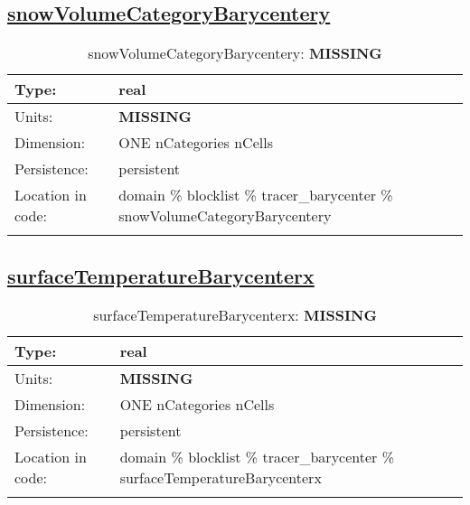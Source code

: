 \subsection[snowVolumeCategoryBarycentery]{\hyperref[sec:var_tab_tracer_barycenter]{snowVolumeCategoryBarycentery}}
\label{subsec:var_sec_tracer_barycenter_snowVolumeCategoryBarycentery}
\begin{center}
\begin{longtable}{| p{2.0in} | p{4.0in} |}
        \hline 
        Type: & real \\
        \hline 
        Units: & {\bf \color{red} MISSING} \\
        \hline 
        Dimension: & ONE nCategories nCells \\
        \hline 
        Persistence: & persistent \\
        \hline 
         Location in code: & domain \% blocklist \% tracer\_barycenter \% snowVolumeCategoryBarycentery \\
         \hline 
    \caption{snowVolumeCategoryBarycentery: {\bf \color{red} MISSING}}
\end{longtable}
\end{center}
\subsection[surfaceTemperatureBarycenterx]{\hyperref[sec:var_tab_tracer_barycenter]{surfaceTemperatureBarycenterx}}
\label{subsec:var_sec_tracer_barycenter_surfaceTemperatureBarycenterx}
\begin{center}
\begin{longtable}{| p{2.0in} | p{4.0in} |}
        \hline 
        Type: & real \\
        \hline 
        Units: & {\bf \color{red} MISSING} \\
        \hline 
        Dimension: & ONE nCategories nCells \\
        \hline 
        Persistence: & persistent \\
        \hline 
         Location in code: & domain \% blocklist \% tracer\_barycenter \% surfaceTemperatureBarycenterx \\
         \hline 
    \caption{surfaceTemperatureBarycenterx: {\bf \color{red} MISSING}}
\end{longtable}
\end{center}
